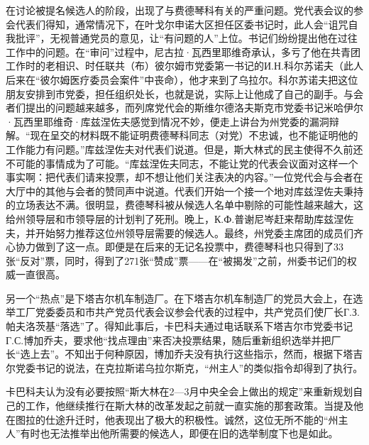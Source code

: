 在讨论被提名候选人的阶段，出现了与费德琴科有关的严重问题。党代表会议的参会代表们得知，通常情况下，在叶戈尔申诺大区担任区委书记时，此人会“诅咒自我批评”，无视普通党员的意见，让“有问题的人”上位。书记们纷纷提出他在过往工作中的问题。在“审问”过程中，尼古拉·瓦西里耶维奇承认，多亏了他在共青团工作时的老相识、时任联共（布）彼尔姆市党委第一书记的И.Н.科尔苏诺夫（此人后来在“彼尔姆医疗委员会案件”中丧命），他才来到了乌拉尔。科尔苏诺夫把这位朋友安排到市党委，担任组织处长，也就是说，实际上让他成了自己的副手。与会者们提出的问题越来越多，而列席党代会的斯维尔德洛夫斯克市党委书记米哈伊尔·瓦西里耶维奇·库兹涅佐夫感觉到情况不妙，便走上讲台为州党委的漏洞辩解。“现在呈交的材料既不能证明费德琴科同志（对党）不忠诚，也不能证明他的工作能力有问题。”库兹涅佐夫对代表们说道。但是，斯大林式的民主使得不久前还不可能的事情成为了可能。“库兹涅佐夫同志，不能让党的代表会议面对这样一个事实啊：把代表们请来投票，却不想让他们关注表决的内容。”一位党代会与会者在大厅中的其他与会者的赞同声中说道。代表们开始一个接一个地对库兹涅佐夫秉持的立场表达不满。很明显，费德琴科被从候选人名单中剔除的可能性越来越大，这给州领导层和市领导层的计划判了死刑。晚上，К.Ф.普谢尼岑赶来帮助库兹涅佐夫，并开始努力推荐这位州领导层需要的候选人。最终，州党委主席团的成员们齐心协力做到了这一点。即便是在后来的无记名投票中，费德琴科也只得到了33张“反对”票，同时，得到了271张“赞成”票——在“被揭发”之前，州委书记们的权威一直很高。

另一个“热点”是下塔吉尔机车制造厂。在下塔吉尔机车制造厂的党员大会上，在选举工厂党委委员和市共产党员代表会议参会代表的过程中，共产党员们使厂长Г.З.帕夫洛茨基“落选”了。得知此事后，卡巴科夫通过电话联系下塔吉尔市党委书记Г.С.博加乔夫，要求他“找点理由”来否决投票结果，随后重新组织选举并把厂长“选上去”。不知出于何种原因，博加乔夫没有执行这些指示，然而，根据下塔吉尔党委书记的说法，在克拉斯诺乌拉尔斯克，“州主人”的类似指令却得到了执行。

卡巴科夫认为没有必要按照“斯大林在2—3月中央全会上做出的规定”来重新规划自己的工作，他继续推行在斯大林的改革发起之前就一直实施的那套政策。当提及他在图拉的仕途升迁时，他表现出了极大的积极性。诚然，这位无所不能的“州主人”有时也无法推举出他所需要的候选人，即便在旧的选举制度下也是如此。

